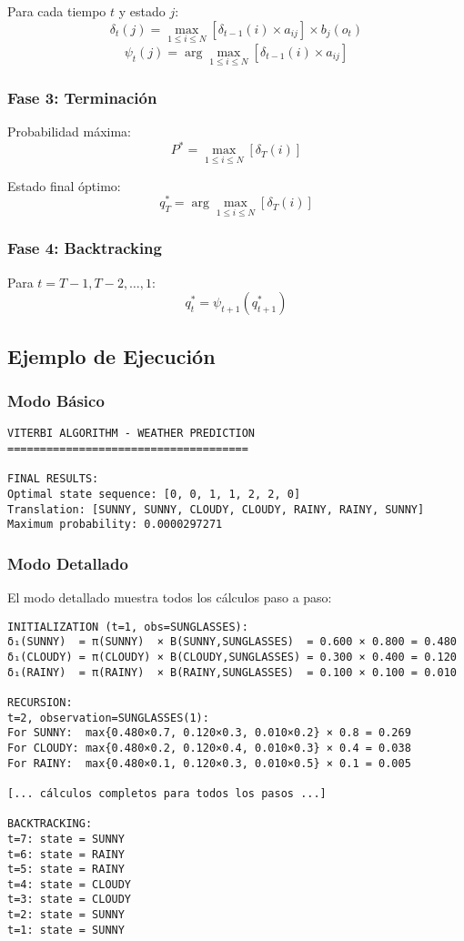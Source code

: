 \documentclass[
]{article}
\begin{document}
Para cada tiempo \(t\) y estado \(j\):
\[\delta_t(j) = \max_{1 \leq i \leq N} [\delta_{t-1}(i) \times a_{ij}] \times b_j(o_t)\]
\[\psi_t(j) = \arg\max_{1 \leq i \leq N} [\delta_{t-1}(i) \times a_{ij}]\]

\subsubsection{Fase 3: Terminación}\label{fase-3-terminaciuxf3n}

Probabilidad máxima: \[P^* = \max_{1 \leq i \leq N} [\delta_T(i)]\]

Estado final óptimo:
\[q_T^* = \arg\max_{1 \leq i \leq N} [\delta_T(i)]\]

\subsubsection{Fase 4: Backtracking}\label{fase-4-backtracking}

Para \(t = T-1, T-2, \ldots, 1\): \[q_t^* = \psi_{t+1}(q_{t+1}^*)\]

\subsection{Ejemplo de Ejecución}\label{ejemplo-de-ejecuciuxf3n}

\subsubsection{Modo Básico}\label{modo-buxe1sico}

\begin{verbatim}
VITERBI ALGORITHM - WEATHER PREDICTION
=====================================

FINAL RESULTS:
Optimal state sequence: [0, 0, 1, 1, 2, 2, 0]
Translation: [SUNNY, SUNNY, CLOUDY, CLOUDY, RAINY, RAINY, SUNNY]
Maximum probability: 0.0000297271
\end{verbatim}

\subsubsection{Modo Detallado}\label{modo-detallado}

El modo detallado muestra todos los cálculos paso a paso:

\begin{verbatim}
INITIALIZATION (t=1, obs=SUNGLASSES):
δ₁(SUNNY)  = π(SUNNY)  × B(SUNNY,SUNGLASSES)  = 0.600 × 0.800 = 0.480
δ₁(CLOUDY) = π(CLOUDY) × B(CLOUDY,SUNGLASSES) = 0.300 × 0.400 = 0.120
δ₁(RAINY)  = π(RAINY)  × B(RAINY,SUNGLASSES)  = 0.100 × 0.100 = 0.010

RECURSION:
t=2, observation=SUNGLASSES(1):
For SUNNY:  max{0.480×0.7, 0.120×0.3, 0.010×0.2} × 0.8 = 0.269
For CLOUDY: max{0.480×0.2, 0.120×0.4, 0.010×0.3} × 0.4 = 0.038
For RAINY:  max{0.480×0.1, 0.120×0.3, 0.010×0.5} × 0.1 = 0.005

[... cálculos completos para todos los pasos ...]

BACKTRACKING:
t=7: state = SUNNY
t=6: state = RAINY
t=5: state = RAINY
t=4: state = CLOUDY
t=3: state = CLOUDY
t=2: state = SUNNY
t=1: state = SUNNY
\end{verbatim}
\end{document}
